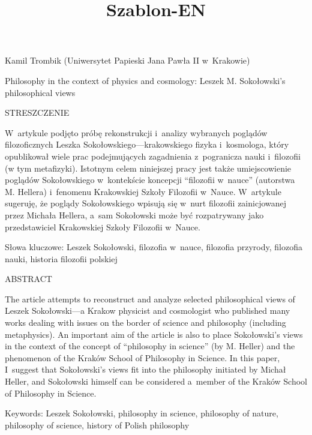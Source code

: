 \setcounter{secnumdepth}{3}





\title{Szablon-EN}



Kamil Trombik (Uniwersytet Papieski Jana Pawła II w~Krakowie)



Philosophy in the context of physics and cosmology: Leszek M. Sokołowski's philosophical views





STRESZCZENIE



W~artykule podjęto próbę rekonstrukcji i~analizy wybranych poglądów filozoficznych Leszka Sokołowskiego---krakowskiego fizyka i~kosmologa, który opublikował wiele prac podejmujących zagadnienia z~pogranicza nauki i~filozofii (w tym metafizyki). Istotnym celem niniejszej pracy jest także umiejscowienie poglądów Sokołowskiego w~kontekście koncepcji ``filozofii w~nauce'' (autorstwa M. Hellera) i~fenomenu Krakowskiej Szkoły Filozofii w~Nauce. W~artykule sugeruję, że poglądy Sokołowskiego wpisują się w~nurt filozofii zainicjowanej przez Michała Hellera, a~sam Sokołowski może być rozpatrywany jako przedstawiciel Krakowskiej Szkoły Filozofii w~Nauce.



Słowa kluczowe: Leszek Sokołowski, filozofia w~nauce, filozofia przyrody, filozofia nauki, historia filozofii polskiej



ABSTRACT



The article attempts to reconstruct and analyze selected philosophical views of Leszek Sokołowski---a Krakow physicist and cosmologist who published many works dealing with issues on the border of science and philosophy (including metaphysics). An important aim of the article is also to place Sokołowski's views in the context of the concept of ``philosophy in science'' (by M. Heller) and the phenomenon of the Kraków School of Philosophy in Science. In this paper, I~suggest that Sokołowski's views fit into the philosophy initiated by Michał Heller, and Sokołowski himself can be considered a~member of the Kraków School of Philosophy in Science.



Keywords: Leszek Sokołowski, philosophy in science, philosophy of nature, philosophy of science, history of Polish philosophy



